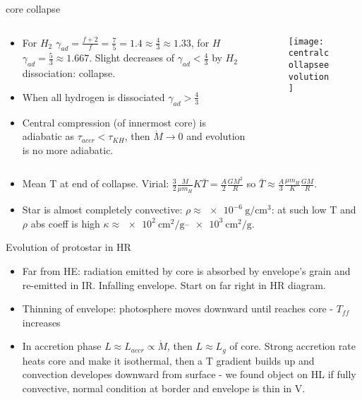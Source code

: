 \begin{frame}{core collapse}
\begin{columns}[T]
	\begin{column}{0.55\textwidth}
	\begin{itemize}
	\item For $H_2$ $\gamma_{ad}=\frac{f+2}{f}=\frac{7}{5}=1.4\approx\frac{4}{3}\approx1.33$, for $H$ $\gamma_{ad}=\frac{5}{3}\approx1.667$.  Slight decreases of $\gamma_{ad}<\frac{4}{3}$ by $H_2$ dissociation: collapse.
	\item When all hydrogen is dissociated $\gamma_{ad}>\frac{4}{3}$
	\item Central compression (of innermost core) is adiabatic as $\tau_{accr}<\tau_{KH}$, then $\dot{M}\to0$ and evolution is no more adiabatic.
	\end{itemize}
	\end{column}
	\begin{column}{0.45\textwidth}
	\begin{figure}[!ht]
	\texttt{[image: centralcollapseevolution]}\label{fig:centralcollapseevolution}
	\end{figure}
	\end{column}
\end{columns}
\begin{itemize}
    \item Mean T at end of collapse. Virial: $\frac{3}{2}\frac{M}{\mu m_H}K\bar{T}=\frac{A}{2}\frac{GM^2}{R}$ so $\bar{T}\approx \frac{A}{3}\frac{\mu m_H}{K}\frac{GM}{R}$.
    \item Star is almost completely convective: $\rho\approx\SI{e-6}{\gram\per\cubic\cm}$: at such low T and $\rho$ abs coeff is high $\kappa\approx\SIrange{e2}{e3}{\square\cm\per\gram}$.
    \end{itemize}
\end{frame}

\begin{frame}{Evolution of protostar in HR}
\begin{itemize}
\item Far from HE: radiation emitted by core is absorbed by envelope's grain and re-emitted in IR. Infalling envelope. Start on far right in HR diagram.
\item Thinning of envelope: photosphere moves downward until reaches core - $T_{ff}$ increases
\item In accretion phase $L\approx L_{accr}\propto\dot{M}$, then $L\approx L_g$ of core. Strong accretion rate heats core and make it isothermal, then a T gradient builds up and convection developes downward from surface - we found object on HL if fully convective, normal condition at border and envelope is thin in V.
\end{itemize}
\end{frame}

